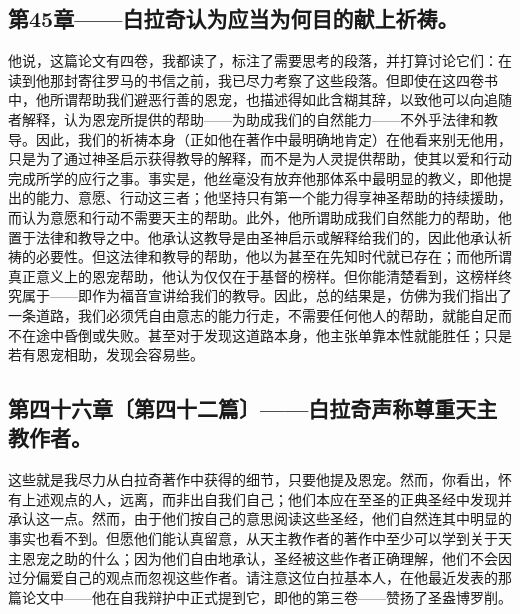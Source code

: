 \subsection{第45章——白拉奇认为应当为何目的献上祈祷。}

他说，这篇论文有四卷，我都读了，标注了需要思考的段落，并打算讨论它们：在读到他那封寄往罗马的书信之前，我已尽力考察了这些段落。但即使在这四卷书中，他所谓帮助我们避恶行善的恩宠，也描述得如此含糊其辞，以致他可以向追随者解释，认为恩宠所提供的帮助——为助成我们的自然能力——不外乎法律和教导。因此，我们的祈祷本身（正如他在著作中最明确地肯定）在他看来别无他用，只是为了通过神圣启示获得教导的解释，而不是为人灵提供帮助，使其以爱和行动完成所学的应行之事。事实是，他丝毫没有放弃他那体系中最明显的教义，即他提出的能力、意愿、行动这三者；他坚持只有第一个能力得享神圣帮助的持续援助，而认为意愿和行动不需要天主的帮助。此外，他所谓助成我们自然能力的帮助，他置于法律和教导之中。他承认这教导是由圣神启示或解释给我们的，因此他承认祈祷的必要性。但这法律和教导的帮助，他以为甚至在先知时代就已存在；而他所谓真正意义上的恩宠帮助，他认为仅仅在于基督的榜样。但你能清楚看到，这榜样终究属于——即作为福音宣讲给我们的教导。因此，总的结果是，仿佛为我们指出了一条道路，我们必须凭自由意志的能力行走，不需要任何他人的帮助，就能自足而不在途中昏倒或失败。甚至对于发现这道路本身，他主张单靠本性就能胜任；只是若有恩宠相助，发现会容易些。\par


\subsection{第四十六章〔第四十二篇〕——白拉奇声称尊重天主教作者。}

这些就是我尽力从白拉奇著作中获得的细节，只要他提及恩宠。然而，你看出，怀有上述观点的人，远离，而非出自我们自己；他们本应在至圣的正典圣经中发现并承认这一点。然而，由于他们按自己的意思阅读这些圣经，他们自然连其中明显的事实也看不到。但愿他们能认真留意，从天主教作者的著作中至少可以学到关于天主恩宠之助的什么；因为他们自由地承认，圣经被这些作者正确理解，他们不会因过分偏爱自己的观点而忽视这些作者。请注意这位白拉基本人，在他最近发表的那篇论文中——他在自我辩护中正式提到它，即他的第三卷——赞扬了圣盎博罗削。\par

